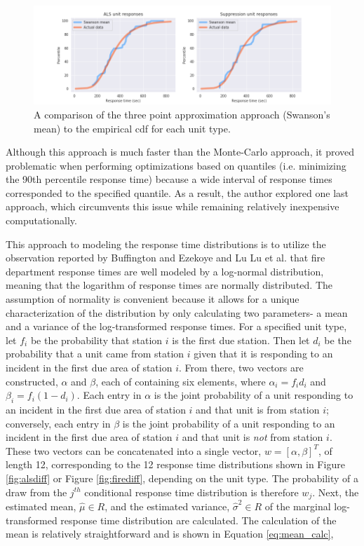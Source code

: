 \documentclass[article]{proc}
\begin{document}
\begin{figure}[!htb]
  \centering
  \includegraphics[width=16cm,keepaspectratio]{Figures/swanson.png}
  \caption{A comparison of the three point approximation approach (Swanson's mean) to the empirical cdf for each unit type.}
  \label{fig:swanson}
\end{figure}

Although this approach is much faster than the Monte-Carlo approach, it proved problematic when performing optimizations based on quantiles (i.e. minimizing the 90th percentile response time) because a wide interval of response times corresponded to the specified quantile. As a result, the author explored one last approach, which circumvents this issue while remaining relatively inexpensive computationally.

This approach to modeling the response time distributions is to utilize the observation reported by Buffington and Ezekoye \cite{buffington2019statistical} and Lu Lu et al. \cite{lu2014correlation} that fire department response times are well modeled by a log-normal distribution, meaning that the logarithm of response times are normally distributed. The assumption of normality is convenient because it allows for a unique characterization of the distribution by only calculating two parameters- a mean and a variance of the log-transformed response times. For a specified unit type, let $f_i$ be the probability that station $i$ is the first due station.  Then let $d_i$ be the probability that a unit came from station $i$ given that it is responding to an incident in the first due area of station $i$. From there, two vectors are constructed, $\alpha$ and $\beta$, each of containing six elements, where $\alpha_i = f_id_i$ and $\beta_i = f_i(1-d_i)$. Each entry in $\alpha$ is the joint probability of a unit responding to an incident in the first due area of station $i$ and that unit is from station $i$; conversely, each entry in $\beta$ is the joint probability of a unit responding to an incident in the first due area of station $i$ and that unit is \textit{not} from station $i$. These two vectors can be concatenated into a single vector, $w = [\alpha, \beta]^T$, of length 12, corresponding to the 12 response time distributions shown in Figure \ref{fig:alsdiff} or Figure \ref{fig:firediff}, depending on the unit type. The probability of a draw from the $j^{th}$ conditional response time distribution is therefore $w_j$. Next, the estimated mean, $\hat\mu \in R$, and the estimated variance, $\hat\sigma^2 \in R$ of the marginal log-transformed response time distribution are calculated. The calculation of the mean is relatively straightforward and is shown in Equation \ref{eq:mean_calc},
\end{document}
